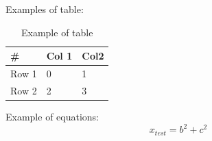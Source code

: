 \documentclass[12pt,a4paper,twoside]{book}
\begin{document}
Examples of table:
\begin{table}[h]
\centering
\begin{tabular}{|l|l|l|}
\hline
\#    & Col 1 & Col2 \\ \hline
Row 1 & 0     & 1    \\ \hline
Row 2 & 2     & 3    \\ \hline
\end{tabular}
\caption{Example of table}
\label{main:table_1}
\end{table}

Example of equations:
\begin{equation}
    x_{test} = b^2 + c^2
\end{equation}

 




\backmatter










\thispagestyle{empty}
\end{document}
